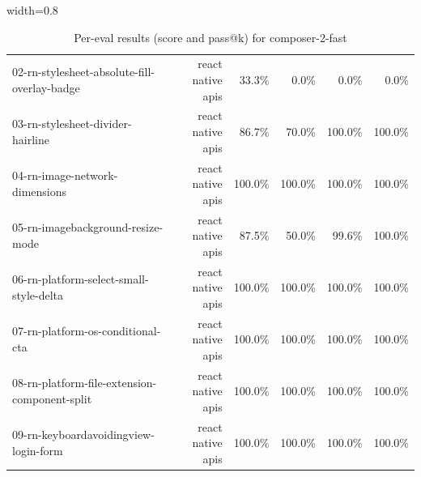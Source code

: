 \begin{table}[htbp]
\begin{adjustbox}{width=0.8\textwidth}
\begin{tabular}{lrrrrr}
02-rn-stylesheet-absolute-fill-overlay-badge & react native apis & 33.3\% & 0.0\% & 0.0\% & 0.0\% \\
03-rn-stylesheet-divider-hairline & react native apis & 86.7\% & 70.0\% & 100.0\% & 100.0\% \\
04-rn-image-network-dimensions & react native apis & 100.0\% & 100.0\% & 100.0\% & 100.0\% \\
05-rn-imagebackground-resize-mode & react native apis & 87.5\% & 50.0\% & 99.6\% & 100.0\% \\
06-rn-platform-select-small-style-delta & react native apis & 100.0\% & 100.0\% & 100.0\% & 100.0\% \\
07-rn-platform-os-conditional-cta & react native apis & 100.0\% & 100.0\% & 100.0\% & 100.0\% \\
08-rn-platform-file-extension-component-split & react native apis & 100.0\% & 100.0\% & 100.0\% & 100.0\% \\
09-rn-keyboardavoidingview-login-form & react native apis & 100.0\% & 100.0\% & 100.0\% & 100.0\% \\
\bottomrule
\end{tabular}
\end{adjustbox}
\caption{Per-eval results (score and pass@k) for composer-2-fast}
\end{table}
